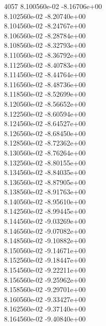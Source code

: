 4057	8.100560e-02	-8.16706e+00	\\ 	8.102560e-02	-8.20740e+00	\\ 	8.104560e-02	-8.24767e+00	\\ 	8.106560e-02	-8.28784e+00	\\ 	8.108560e-02	-8.32793e+00	\\ 	8.110560e-02	-8.36792e+00	\\ 	8.112560e-02	-8.40783e+00	\\ 	8.114560e-02	-8.44764e+00	\\ 	8.116560e-02	-8.48736e+00	\\ 	8.118560e-02	-8.52699e+00	\\ 	8.120560e-02	-8.56652e+00	\\ 	8.122560e-02	-8.60594e+00	\\ 	8.124560e-02	-8.64527e+00	\\ 	8.126560e-02	-8.68450e+00	\\ 	8.128560e-02	-8.72362e+00	\\ 	8.130560e-02	-8.76264e+00	\\ 	8.132560e-02	-8.80155e+00	\\ 	8.134560e-02	-8.84035e+00	\\ 	8.136560e-02	-8.87905e+00	\\ 	8.138560e-02	-8.91763e+00	\\ 	8.140560e-02	-8.95610e+00	\\ 	8.142560e-02	-8.99445e+00	\\ 	8.144560e-02	-9.03269e+00	\\ 	8.146560e-02	-9.07082e+00	\\ 	8.148560e-02	-9.10882e+00	\\ 	8.150560e-02	-9.14671e+00	\\ 	8.152560e-02	-9.18447e+00	\\ 	8.154560e-02	-9.22211e+00	\\ 	8.156560e-02	-9.25962e+00	\\ 	8.158560e-02	-9.29701e+00	\\ 	8.160560e-02	-9.33427e+00	\\ 	8.162560e-02	-9.37140e+00	\\ 	8.164560e-02	-9.40840e+00	\\ \hline
